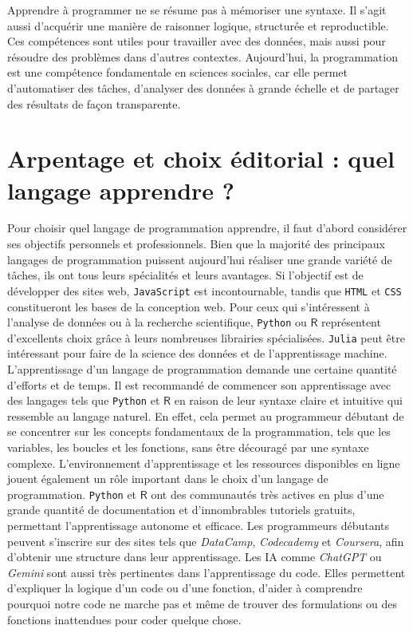 \documentclass[
  letterpaper,
  DIV=11,
  numbers=noendperiod,
  oneside]{scrreprt}
\begin{document}
Apprendre à programmer ne se résume pas à mémoriser une syntaxe. Il
s'agit aussi d'acquérir une manière de raisonner logique, structurée et
reproductible. Ces compétences sont utiles pour travailler avec des
données, mais aussi pour résoudre des problèmes dans d'autres contextes.
Aujourd'hui, la programmation est une compétence fondamentale en
sciences sociales, car elle permet d'automatiser des tâches, d'analyser
des données à grande échelle et de partager des résultats de façon
transparente.

\hypertarget{arpentage-et-choix-uxe9ditorial-quel-langage-apprendre}{%
\section{Arpentage et choix éditorial : quel langage apprendre
?}\label{arpentage-et-choix-uxe9ditorial-quel-langage-apprendre}}

Pour choisir quel langage de programmation apprendre, il faut d'abord
considérer ses objectifs personnels et professionnels. Bien que la
majorité des principaux langages de programmation puissent aujourd'hui
réaliser une grande variété de tâches, ils ont tous leurs spécialités et
leurs avantages. Si l'objectif est de développer des sites web,
\texttt{JavaScript} est incontournable, tandis que \texttt{HTML} et
\texttt{CSS} constitueront les bases de la conception web. Pour ceux qui
s'intéressent à l'analyse de données ou à la recherche scientifique,
\texttt{Python} ou \(\textsf{R}\) représentent d'excellents choix grâce
à leurs nombreuses librairies spécialisées. \texttt{Julia} peut être
intéressant pour faire de la science des données et de l'apprentissage
machine. L'apprentissage d'un langage de programmation demande une
certaine quantité d'efforts et de temps. Il est recommandé de commencer
son apprentissage avec des langages tels que \texttt{Python} et
\(\textsf{R}\) en raison de leur syntaxe claire et intuitive qui
ressemble au langage naturel. En effet, cela permet au programmeur
débutant de se concentrer sur les concepts fondamentaux de la
programmation, tels que les variables, les boucles et les fonctions,
sans être découragé par une syntaxe complexe. L'environnement
d'apprentissage et les ressources disponibles en ligne jouent également
un rôle important dans le choix d'un langage de programmation.
\texttt{Python} et \(\textsf{R}\) ont des communautés très actives en
plus d'une grande quantité de documentation et d'innombrables tutoriels
gratuits, permettant l'apprentissage autonome et efficace. Les
programmeurs débutants peuvent s'inscrire sur des sites tels que
\emph{DataCamp}, \emph{Codecademy} et \emph{Coursera}, afin d'obtenir
une structure dans leur apprentissage. Les IA comme \emph{ChatGPT} ou
\emph{Gemini} sont aussi très pertinentes dans l'apprentissage du code.
Elles permettent d'expliquer la logique d'un code ou d'une fonction,
d'aider à comprendre pourquoi notre code ne marche pas et même de
trouver des formulations ou des fonctions inattendues pour coder quelque
chose.
\end{document}
